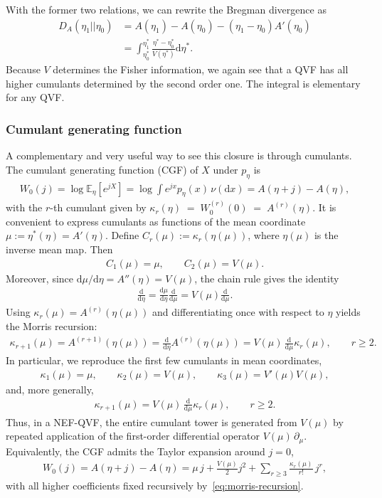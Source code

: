 \documentclass[a4paper,11pt]{article}
\numberwithin{equation}{section}
\theoremstyle{plain}
\theoremstyle{definition}
\theoremstyle{remark}
\newcommand{\1}{\ensuremath{\mathds{1}}\xspace}
\newcommand{\dd}{\ensuremath{{\textrm{d}}}\xspace}
\newcommand{\E}{{\ensuremath{{\mathbb{E}}}}\xspace}
\begin{document}
With the former two relations, we can rewrite the Bregman divergence as 
\begin{align}
    D_A(\eta_1||\eta_0)&=A(\eta_1)-A(\eta_0)-(\eta_1-\eta_0) A'(\eta_0)\nonumber\\
    &=\int_{\eta_0^\ast}^{\eta_1^\ast}\frac{\eta^\ast-\eta_0^\ast}{V(\eta^\ast)}\dd\eta^\ast.\label{Eq:bregman-qvf}
\end{align}
Because $V$ determines the Fisher information, we again see that a QVF has all higher cumulants determined by the second order one. The integral is elementary for any QVF.

\subsubsection{Cumulant generating function}
A complementary and very useful way to see this closure is through cumulants. The cumulant generating function (CGF) of $X$ under $p_\eta$ is
\begin{align}
W_0(j)=\log\E_\eta[e^{jX}]
=\log\int e^{jx}p_\eta(x)\,\nu(\dd x)
=A(\eta+j)-A(\eta),
\label{eq:nef-cgf-shift}
\end{align}
with the $r$-th cumulant given by $\kappa_r(\eta)\;=\;W_0^{(r)}(0)\;=\;A^{(r)}(\eta)$.
It is convenient to express cumulants as functions of the mean coordinate $\mu:=\eta^\ast(\eta)=A'(\eta)$.
Define $C_r(\mu):=\kappa_r(\eta(\mu))$, where $\eta(\mu)$ is the inverse mean map. Then
\begin{align}
C_1(\mu)=\mu,
\qquad
C_2(\mu)=V(\mu).
\end{align}
Moreover, since $\dd\mu/\dd\eta=A''(\eta)=V(\mu)$, the chain rule gives the identity
\begin{align}
\frac{\dd}{\dd\eta}= \frac{\dd\mu}{\dd\eta}\frac{\dd}{\dd\mu}=V(\mu)\frac{\dd}{\dd\mu}.
\end{align}
Using $\kappa_r(\mu)=A^{(r)}(\eta(\mu))$ and differentiating once with respect to $\eta$ yields the Morris recursion:
\begin{align}
\kappa_{r+1}(\mu)
=A^{(r+1)}(\eta(\mu))
=\frac{\dd}{\dd\eta}A^{(r)}(\eta(\mu))
=V(\mu)\,\frac{\dd}{\dd\mu}\kappa_r(\mu),
\qquad r\ge 2.
\label{eq:morris-recursion}
\end{align}
In particular, we reproduce the first few cumulants in mean coordinates,
\begin{align}
\kappa_1(\mu)=\mu,
\qquad
\kappa_2(\mu)=V(\mu),
\qquad
\kappa_3(\mu)=V'(\mu)V(\mu),
\end{align}
and, more generally,
\begin{align}
\kappa_{r+1}(\mu)=V(\mu)\,\frac{\dd}{\dd\mu}\kappa_r(\mu),
\qquad r\ge 2.\label{eq:cumulant-recursion}
\end{align}
Thus, in a NEF-QVF, the entire cumulant tower is generated from $V(\mu)$ by repeated application of the first-order differential operator $V(\mu)\,\partial_\mu$.
Equivalently, the CGF admits the Taylor expansion around $j=0$,
\begin{align}
W_0(j)=A(\eta+j)-A(\eta)
=\mu\,j+\frac{V(\mu)}{2}j^2+\sum_{r\ge 3}\frac{\kappa_r(\mu)}{r!}\,j^r,
\label{eq:cgf-cumulant-series}
\end{align}
with all higher coefficients fixed recursively by~\eqref{eq:morris-recursion}.
\end{document}
